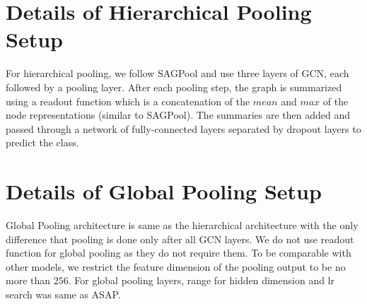 \documentclass[letterpaper]{article} \usepackage{aaai20}  \usepackage{times}  \usepackage{helvet} \usepackage{courier}  \usepackage[hyphens]{url}  \usepackage{graphicx} \urlstyle{rm} \def\UrlFont{\rm}  \usepackage{graphicx}  \frenchspacing  \setlength{\pdfpagewidth}{8.5in}  \setlength{\pdfpageheight}{11in}
\begin{document}
	
	\section{Details of Hierarchical Pooling Setup}
	\label{ssec:global-pool}
	For hierarchical pooling, we follow SAGPool \cite{sag} and use three layers of GCN, each followed by a pooling layer. After each pooling step, the graph is summarized using a readout function which is a concatenation of the $mean$ and $max$ of the node representations (similar to SAGPool). The summaries are then added and passed through a network of fully-connected layers separated by dropout layers to predict the class.
	
	
	\section{Details of Global Pooling Setup}
	Global Pooling architecture is same as the hierarchical architecture with the only difference that pooling is done only after all GCN layers. We do not use readout function for global pooling as they do not require them. To be comparable with other models, we restrict the feature dimension of the pooling output to be no more than $256$. For global pooling layers, range for hidden dimension and lr search was same as ASAP.
	
	\begin{table}[tbh!]
\begin{center}
			\begin{small}
				\caption{\label{tab:statistics}Global Pooling Hyperparameter Tuning Summary.}
\end{small}
		\end{center}
		\vskip -0.1in
	\end{table}
	
	
\end{document}
